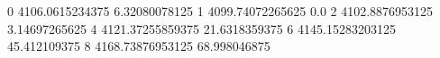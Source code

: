 0 4106.0615234375 6.32080078125
1 4099.74072265625 0.0
2 4102.8876953125 3.14697265625
4 4121.37255859375 21.6318359375
6 4145.15283203125 45.412109375
8 4168.73876953125 68.998046875
